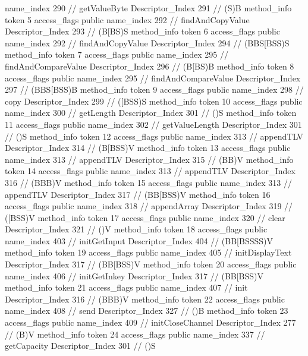 {{{{{					name_index	290		// getValueByte
					Descriptor_Index	291		// (S)B
				}
				method_info {
					token	5
					access_flags	public
					name_index	292		// findAndCopyValue
					Descriptor_Index	293		// (B[BS)S
				}
				method_info {
					token	6
					access_flags	public
					name_index	292		// findAndCopyValue
					Descriptor_Index	294		// (BBS[BSS)S
				}
				method_info {
					token	7
					access_flags	public
					name_index	295		// findAndCompareValue
					Descriptor_Index	296		// (B[BS)B
				}
				method_info {
					token	8
					access_flags	public
					name_index	295		// findAndCompareValue
					Descriptor_Index	297		// (BBS[BSS)B
				}
				method_info {
					token	9
					access_flags	public
					name_index	298		// copy
					Descriptor_Index	299		// ([BSS)S
				}
				method_info {
					token	10
					access_flags	public
					name_index	300		// getLength
					Descriptor_Index	301		// ()S
				}
				method_info {
					token	11
					access_flags	public
					name_index	302		// getValueLength
					Descriptor_Index	301		// ()S
				}
				method_info {
					token	12
					access_flags	public
					name_index	313		// appendTLV
					Descriptor_Index	314		// (B[BSS)V
				}
				method_info {
					token	13
					access_flags	public
					name_index	313		// appendTLV
					Descriptor_Index	315		// (BB)V
				}
				method_info {
					token	14
					access_flags	public
					name_index	313		// appendTLV
					Descriptor_Index	316		// (BBB)V
				}
				method_info {
					token	15
					access_flags	public
					name_index	313		// appendTLV
					Descriptor_Index	317		// (BB[BSS)V
				}
				method_info {
					token	16
					access_flags	public
					name_index	318		// appendArray
					Descriptor_Index	319		// ([BSS)V
				}
				method_info {
					token	17
					access_flags	public
					name_index	320		// clear
					Descriptor_Index	321		// ()V
				}
				method_info {
					token	18
					access_flags	public
					name_index	403		// initGetInput
					Descriptor_Index	404		// (BB[BSSSS)V
				}
				method_info {
					token	19
					access_flags	public
					name_index	405		// initDisplayText
					Descriptor_Index	317		// (BB[BSS)V
				}
				method_info {
					token	20
					access_flags	public
					name_index	406		// initGetInkey
					Descriptor_Index	317		// (BB[BSS)V
				}
				method_info {
					token	21
					access_flags	public
					name_index	407		// init
					Descriptor_Index	316		// (BBB)V
				}
				method_info {
					token	22
					access_flags	public
					name_index	408		// send
					Descriptor_Index	327		// ()B
				}
				method_info {
					token	23
					access_flags	public
					name_index	409		// initCloseChannel
					Descriptor_Index	277		// (B)V
				}
				method_info {
					token	24
					access_flags	public
					name_index	337		// getCapacity
					Descriptor_Index	301		// ()S
				}
			}
		}
	}
}
